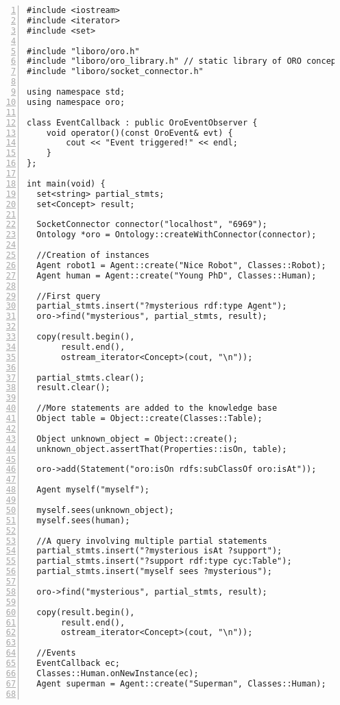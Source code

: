 \lstset{language=c++}
\begin{lstlisting}[numbers=left,caption=Example of interaction with {\tt oro-server} in C++, label = code|ex-cpp]
#include <iostream>
#include <iterator>
#include <set>

#include "liboro/oro.h"
#include "liboro/oro_library.h" // static library of ORO concepts
#include "liboro/socket_connector.h"

using namespace std;
using namespace oro;

class EventCallback : public OroEventObserver {
    void operator()(const OroEvent& evt) {
        cout << "Event triggered!" << endl;
    }
};
  
int main(void) {
  set<string> partial_stmts;
  set<Concept> result;
  
  SocketConnector connector("localhost", "6969");
  Ontology *oro = Ontology::createWithConnector(connector);
  
  //Creation of instances
  Agent robot1 = Agent::create("Nice Robot", Classes::Robot);
  Agent human = Agent::create("Young PhD", Classes::Human);
  
  //First query
  partial_stmts.insert("?mysterious rdf:type Agent");
  oro->find("mysterious", partial_stmts, result);
  
  copy(result.begin(), 
       result.end(), 
       ostream_iterator<Concept>(cout, "\n"));
  
  partial_stmts.clear();
  result.clear();
  
  //More statements are added to the knowledge base
  Object table = Object::create(Classes::Table);

  Object unknown_object = Object::create();
  unknown_object.assertThat(Properties::isOn, table);
  
  oro->add(Statement("oro:isOn rdfs:subClassOf oro:isAt"));
  
  Agent myself("myself");
  
  myself.sees(unknown_object);
  myself.sees(human);
  
  //A query involving multiple partial statements
  partial_stmts.insert("?mysterious isAt ?support");
  partial_stmts.insert("?support rdf:type cyc:Table");
  partial_stmts.insert("myself sees ?mysterious");
  
  oro->find("mysterious", partial_stmts, result);
  
  copy(result.begin(), 
       result.end(), 
       ostream_iterator<Concept>(cout, "\n"));
  
  //Events
  EventCallback ec;
  Classes::Human.onNewInstance(ec);
  Agent superman = Agent::create("Superman", Classes::Human);
  

\end{lstlisting}
